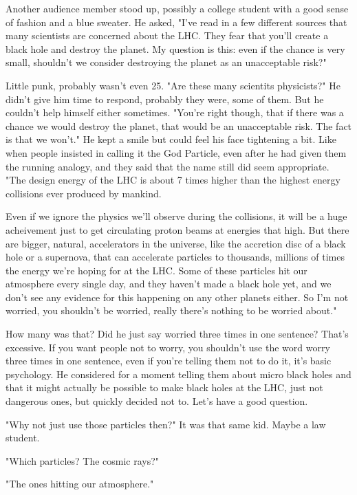 Another audience member stood up, possibly a college student with a good sense of fashion and a blue sweater. He asked, "I've read in a few different sources that many scientists are concerned about the LHC. They fear that you'll create a black hole and destroy the planet. My question is this: even if the chance is very small, shouldn't we consider destroying the planet as an unacceptable risk?"

Little punk, probably wasn't even 25. "Are these many scientits physicists?" He didn't give him time to respond, probably they were, some of them. But he couldn't help himself either sometimes. "You're right though, that if there was a chance we would destroy the planet, that would be an unacceptable risk. The fact is that we won't." He kept a smile but could feel his face tightening a bit. Like when people insisted in calling it the God Particle, even after he had given them the running analogy, and they said that the name still did seem appropriate. "The design energy of the LHC is about 7 times higher than the highest energy collisions ever produced by mankind.

Even if we ignore the physics we'll observe during the collisions, it will be a huge acheivement just to get circulating proton beams at energies that high. But there are bigger, natural, accelerators in the universe, like the accretion disc of a black hole or a supernova, that can accelerate particles to thousands, millions of times the energy we're hoping for at the LHC. Some of these particles hit our atmosphere every single day, and they haven't made a black hole yet, and we don't see any evidence for this happening on any other planets either. So I'm not worried, you shouldn't be worried, really there's nothing to be worried about."

How many was that? Did he just say worried three times in one sentence? That's excessive. If you want people not to worry, you shouldn't use the word worry three times in one sentence, even if you're telling them not to do it, it's basic psychology. He considered for a moment telling them about micro black holes and that it might actually be possible to make black holes at the LHC, just not dangerous ones, but quickly decided not to. Let's have a good question.

"Why not just use those particles then?" It was that same kid. Maybe a law student.

"Which particles? The cosmic rays?" 

"The ones hitting our atmosphere." 


